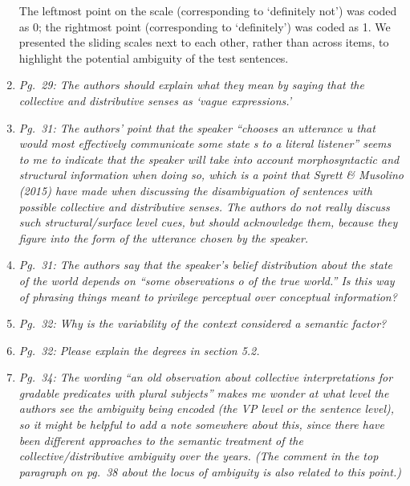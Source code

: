 \documentclass[12pt]{article}
\begin{document}
\begin{enumerate}
The leftmost point on the scale (corresponding to `definitely not') was coded as 0; the rightmost point (corresponding to `definitely') was coded as 1. We presented the sliding scales next to each other, rather than across items, to highlight the potential ambiguity of the test sentences.

\item \emph{Pg.~29: The authors should explain what they mean by saying that the collective and distributive senses as `vague expressions.'}

\item \emph{Pg.~31: The authors' point that the speaker ``chooses an utterance u that would most effectively communicate some state s to a literal listener'' seems to me to indicate that the speaker will take
into account morphosyntactic and structural information when doing so, which is a point that Syrett \& Musolino (2015) have made when discussing the disambiguation of sentences with possible collective and distributive senses. The authors do not really discuss such structural/surface level cues, but should acknowledge them, because they figure into the form of the utterance chosen by the speaker.}

\item \emph{Pg.~31: The authors say that the speaker's belief distribution about the state of the world depends on ``some observations o of the true world.'' Is this way of phrasing things meant to privilege perceptual over conceptual information?}

\item \emph{Pg.~32: Why is the variability of the context considered a semantic factor?} 

\item \emph{Pg.~32: Please explain the degrees in section 5.2.}

\item \emph{Pg.~34: The wording ``an old observation about collective interpretations for gradable predicates with plural subjects'' makes me wonder at what level the authors see the ambiguity being encoded (the VP level or the sentence level), so it might be helpful to add a note somewhere about this, since there have been different approaches to the semantic treatment of the collective/distributive ambiguity over the years. (The comment in the top paragraph on pg.~38 about the locus of ambiguity is also related to this point.)}




\end{enumerate}
\end{document}
